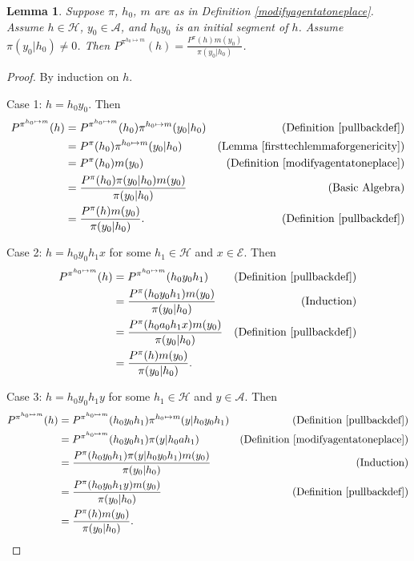 \documentclass[twoside]{article}
\newtheorem{lemma}[theorem]{Lemma}
\begin{document}
\begin{lemma}
\label{secondtechlemmaforgenericity}
    Suppose $\pi$, $h_0$, $m$ are as in Definition \ref{modifyagentatoneplace}.
    Assume $h\in\mathcal H$, $y_0\in\mathcal A$, and $h_0y_0$ is
    an initial segment of $h$. Assume $\pi(y_0|h_0)\not=0$. Then
    $P^{\pi^{h_0\mapsto m}}(h) = \frac{P^\pi(h)m(y_0)}{\pi(y_0|h_0)}$.
\end{lemma}

\begin{proof}
    By induction on $h$.

    Case 1: $h=h_0y_0$. Then
    \begin{align*}
        P^{\pi^{h_0\mapsto m}}(h)
        &= P^{\pi^{h_0\mapsto m}}(h_0)\pi^{h_0\mapsto m}(y_0|h_0)
            &\mbox{(Definition \ref{pullbackdef})}\\
        &= P^\pi(h_0)\pi^{h_0\mapsto m}(y_0|h_0)
            &\mbox{(Lemma \ref{firsttechlemmaforgenericity})}\\
        &= P^\pi(h_0)m(y_0)
            &\mbox{(Definition \ref{modifyagentatoneplace})}\\
        &= \frac{P^\pi(h_0)\pi(y_0|h_0)m(y_0)}{\pi(y_0|h_0)}
            &\mbox{(Basic Algebra)}\\
        &= \frac{P^\pi(h)m(y_0)}{\pi(y_0|h_0)}.
            &\mbox{(Definition \ref{pullbackdef})}
    \end{align*}

    Case 2: $h=h_0 y_0 h_1 x$ for some $h_1\in\mathcal H$
        and $x\in\mathcal E$. Then
    \begin{align*}
        P^{\pi^{h_0\mapsto m}}(h)
        &= P^{\pi^{h_0\mapsto m}}(h_0 y_0 h_1)
            &\mbox{(Definition \ref{pullbackdef})}\\
        &= \frac{P^\pi(h_0 y_0 h_1)m(y_0)}{\pi(y_0|h_0)}
            &\mbox{(Induction)}\\
        &= \frac{P^\pi(h_0 a_0 h_1 x)m(y_0)}{\pi(y_0|h_0)}
            &\mbox{(Definition \ref{pullbackdef})}\\
        &= \frac{P^\pi(h)m(y_0)}{\pi(y_0|h_0)}.
    \end{align*}

    Case 3: $h=h_0 y_0 h_1 y$ for some $h_1\in\mathcal H$ and
        $y\in\mathcal A$. Then
    \begin{align*}
        P^{\pi^{h_0\mapsto m}}(h)
        &= P^{\pi^{h_0\mapsto m}}(h_0 y_0 h_1)
            \pi^{h_0\mapsto m}(y|h_0 y_0 h_1)
            &\mbox{(Definition \ref{pullbackdef})}\\
        &= P^{\pi^{h_0\mapsto m}}(h_0 y_0 h_1)
            \pi(y|h_0 a h_1)
            &\mbox{(Definition \ref{modifyagentatoneplace})}\\
        &= \frac{P^\pi(h_0 y_0 h_1)\pi(y|h_0 y_0 h_1)m(y_0)}{\pi(y_0|h_0)}
            &\mbox{(Induction)}\\
        &= \frac{P^\pi(h_0 y_0 h_1 y)m(y_0)}{\pi(y_0|h_0)}
            &\mbox{(Definition \ref{pullbackdef})}\\
        &= \frac{P^\pi(h)m(y_0)}{\pi(y_0|h_0)}.
    \end{align*}
\end{proof}
\end{document}
